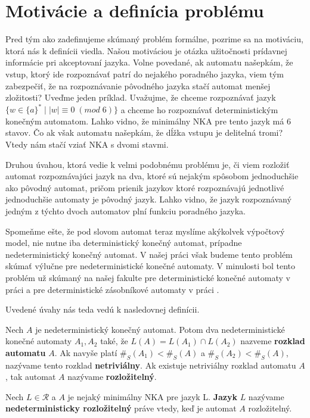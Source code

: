 \section{Motivácie a definícia problému}
Pred tým ako zadefinujeme skúmaný problém formálne, pozrime sa na motiváciu, ktorá nás k definícii viedla. Našou motiváciou je otázka užitočnosti prídavnej informácie pri akceptovaní jazyka. Volne povedané, ak automatu našepkám, že vstup, ktorý ide rozpoznávať patrí do nejakého poradného jazyka, viem tým zabezpečiť, že na rozpoznávanie pôvodného jazyka stačí automat menšej zložitosti? Uveďme jeden príklad. Uvažujme, že chceme rozpoznávať jazyk $ \lbrace w \in \lbrace a \rbrace^* \; | \; |w| \equiv 0 \; (mod \; 6) \rbrace $ a chceme ho rozpoznávať deterministickým konečným automatom. Lahko vidno, že minimálny NKA pre tento jazyk má 6 stavov. Čo ak však automatu našepkám, že dĺžka vstupu je delitelná tromi? Vtedy nám stačí vziať NKA s dvomi stavmi. 
\par
Druhou úvahou, ktorá vedie k velmi podobnému problému je, či viem rozložiť automat rozpoznávajúci jazyk na dva, ktoré sú nejakým spôsobom jednoduchšie ako pôvodný automat, pričom prienik jazykov ktoré rozpoznávajú jednotlivé jednoduchšie automaty je pôvodný jazyk. Lahko vidno, že jazyk rozpoznávaný jedným z týchto dvoch automatov plní funkciu poradného jazyka.
\par
Spomeňme ešte, že pod slovom automat teraz myslíme akýkolvek výpočtový model, nie nutne iba deterministický konečný automat, prípadne nedeterministický konečný automat. V našej práci však budeme tento problém skúmať výlučne pre nedeterministické konečné automaty. V minulosti bol tento problém už skúmaný na našej fakulte pre deterministické konečné automaty v práci \cite{Gazi} a pre deterministické zásobníkové automaty v práci \cite{Labath}.
\par Uvedené úvahy nás teda vedú k nasledovnej definícii.

\begin{definition}
Nech $ A $ je nedeterministický konečný automat. Potom dva nedeterministické konečné automaty $ A_1, A_2 $ také, že $ L(A)=L(A_1) \cap L(A_2) $ nazveme \textbf{rozklad automatu} $ A $. Ak navyše platí $ \#_S(A_1) < \#_S(A)$ a $ \#_S(A_2) < \#_S(A) $, nazývame tento rozklad \textbf{netriviálny}. Ak existuje netriviálny rozklad automatu $ A $, tak automat $ A $ nazývame \textbf{rozložitelný}.
\end{definition}

\begin{definition}
\label{def:nedeterministic_decomposability_of_language}
Nech $ L \in \mathscr{R} $ a $ A $ je nejaký minimálny NKA pre jazyk L. \textbf{Jazyk} $ L $ nazývame \textbf{nedeterministicky rozložitelný} práve vtedy, keď je automat $ A $ rozložitelný.
\end{definition}

